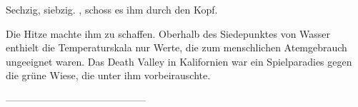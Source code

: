 Sechzig, siebzig. , schoss es ihm durch den Kopf. 

Die Hitze machte ihm zu schaffen. Oberhalb des Siedepunktes von Wasser enthielt die Temperaturskala nur Werte, die zum menschlichen Atemgebrauch ungeeignet waren. Das Death Valley in Kalifornien war ein Spielparadies gegen die grüne Wiese, die unter ihm vorbeirauschte.























































------------------------------------------



















































